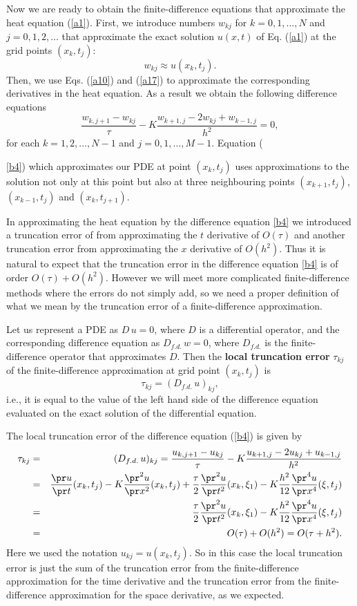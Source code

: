  
Now we are ready to obtain the finite-difference equations that approximate
the heat equation (\ref{a1}). First, we introduce numbers $w_{kj}$ for $k=0,1,\dots,N$ and
$j=0,1,2,\dots$ that approximate the exact solution $u(x,t)$ of Eq. (\ref{a1}) at the grid points
$(x_{k}, t_{j})$:
\[
w_{kj}\approx u(x_{k},t_{j}).
\]
Then, we use Eqs. (\ref{a10}) and (\ref{a17}) to approximate
the corresponding derivatives in the heat equation. As a result we obtain the following
difference equations
\begin{equation}
\frac{w_{k,j+1}-w_{kj}}{\tau}-K
\frac{w_{k+1, j}-2w_{kj}+w_{k-1,j}}{h^{2}}=0, \label{b4}
\end{equation}
for each $k=1, 2, \dots, N-1$ and $j=0, 1, \dots, M-1$. Equation ({\ref{b4})
which approximates our PDE at point $(x_{k},t_{j})$ uses approximations to the solution
not only at this point but also
at three neighbouring points $(x_{k+1},t_{j})$, $(x_{k-1},t_{j})$ and $(x_{k},t_{j+1})$.

In approximating the heat equation by the difference equation \eqref{b4} we
introduced a truncation error of from approximating the $t$ derivative of $O(\tau)$
and another truncation error from approximating the $x$ derivative of $O(h^2)$.
Thus it is natural to expect that the truncation error in the difference
equation \eqref{b4} is of order $O(\tau)+O(h^2)$. However we will meet more 
complicated finite-difference methods where the errors do not simply add, so
we need a proper definition of what we mean by the truncation error of a 
finite-difference approximation.

\begin{definition}
Let us represent a PDE as $D\,u=0$, where $D$ is a differential operator,
and the corresponding difference equation as $D_{f.d.}\,w=0$, where
$D_{f.d.}$ is the finite-difference operator that approximates $D$. Then
the {\bf local truncation error} $\tau_{kj}$ of the finite-difference 
approximation at grid point $(x_k,t_j)$ is 
\[\tau_{kj}=(D_{f.d.}\,u)_{kj},\]
i.e., it is equal to the value of the left hand side of the difference
equation evaluated on the exact solution of the differential equation.
\end{definition}
The local truncation error of
the difference equation (\ref{b4}) is given by
\begin{eqnarray*}
\tau_{kj} &=& (D_{f.d.}\,u)_{kj} =
\frac{u_{k,j+1}-u_{kj}}{\tau}-K
\frac{u_{k+1, j}-2u_{kj}+u_{k-1,j}}{h^{2}} \\
&=& \frac{\pr u}{\pr t}(x_{k},t_{j})-
K\frac{\pr^2 u}{\pr x^2}(x_{k},t_{j})+
\frac{\tau}{2}\frac{\pr^{2} u}{\pr t^{2}}(x_{k},
\xi_{1})- K\frac{h^{2}}{12}\frac{\pr^{4} u}{\pr x^{4}}(\xi,t_{j})\\
&=&\frac{\tau}{2}\frac{\pr^{2} u}{\pr t^{2}}(x_{k},
\xi_{1})- K\frac{h^{2}}{12}\frac{\pr^{4} u}{\pr x^{4}}(\xi,t_{j})\\
&=&O(\tau)+O(h^{2})=O(\tau+h^{2}). 
\end{eqnarray*}
Here we used the notation $u_{kj}=u(x_{k}, t_{j})$. 
So in this case the local truncation error is just the sum of the truncation error
from the finite-difference approximation for the time derivative and
the truncation error from the finite-difference approximation for the space
derivative, as we expected.

}
